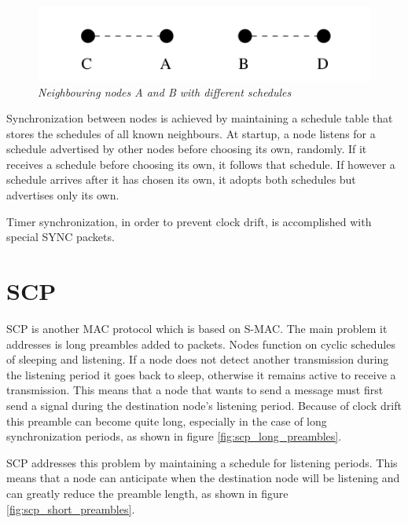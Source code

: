 \begin{figure}[ht]
	\begin{center}
		\includegraphics{img/s-mac_schedules.pdf}
	\end{center}
	\caption{\small \itshape{Neighbouring nodes A and B with different
	schedules\protect\footnotemark}}
	\label{fig:s-mac_schedules}
\end{figure}

Synchronization between nodes is achieved by maintaining a schedule table that
stores the schedules of all known neighbours. At startup, a node listens for a
schedule advertised by other nodes before choosing its own, randomly. If it
receives a schedule before choosing its own, it follows that schedule. If
however a schedule arrives after it has chosen its own, it adopts both schedules
but advertises only its own.

Timer synchronization, in order to prevent clock drift, is
accomplished with special SYNC packets.

\section{SCP}

SCP\cite{ye2006ultra} is another MAC protocol which is based on S-MAC. The main
problem it addresses is long preambles added to packets. Nodes function on
cyclic schedules of sleeping and listening. If a node does not detect another
transmission during the listening period it goes back to sleep, otherwise it
remains active to receive a transmission. This means that a node that wants
to send a message must first send a signal during the destination node's
listening period. Because of clock drift this preamble can become quite long,
especially in the case of long synchronization periods, as shown in figure
\ref{fig:scp_long_preambles}.

SCP addresses this problem by maintaining a schedule for listening periods.
This means that a node can anticipate when the destination node will be
listening and can greatly reduce the preamble length, as shown in figure
\ref{fig:scp_short_preambles}.

